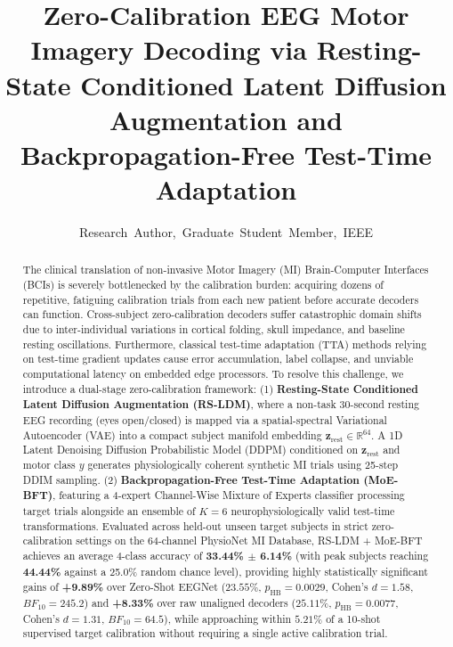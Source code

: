 \documentclass[journal,10pt]{IEEEtran}
\begin{document}
\title{Zero-Calibration EEG Motor Imagery Decoding via Resting-State Conditioned Latent Diffusion Augmentation and Backpropagation-Free Test-Time Adaptation}

\author{Research~Author,~Graduate~Student~Member,~IEEE}


\maketitle

\begin{abstract}
The clinical translation of non-invasive Motor Imagery (MI) Brain-Computer Interfaces (BCIs) is severely bottlenecked by the calibration burden: acquiring dozens of repetitive, fatiguing calibration trials from each new patient before accurate decoders can function. Cross-subject zero-calibration decoders suffer catastrophic domain shifts due to inter-individual variations in cortical folding, skull impedance, and baseline resting oscillations. Furthermore, classical test-time adaptation (TTA) methods relying on test-time gradient updates cause error accumulation, label collapse, and unviable computational latency on embedded edge processors.
To resolve this challenge, we introduce a dual-stage zero-calibration framework: (1) \textbf{Resting-State Conditioned Latent Diffusion Augmentation (RS-LDM)}, where a non-task 30-second resting EEG recording (eyes open/closed) is mapped via a spatial-spectral Variational Autoencoder (VAE) into a compact subject manifold embedding $\mathbf{z}_{\text{rest}} \in \mathbb{R}^{64}$. A 1D Latent Denoising Diffusion Probabilistic Model (DDPM) conditioned on $\mathbf{z}_{\text{rest}}$ and motor class $y$ generates physiologically coherent synthetic MI trials using 25-step DDIM sampling. (2) \textbf{Backpropagation-Free Test-Time Adaptation (MoE-BFT)}, featuring a 4-expert Channel-Wise Mixture of Experts classifier processing target trials alongside an ensemble of $K=6$ neurophysiologically valid test-time transformations. Evaluated across held-out unseen target subjects in strict zero-calibration settings on the 64-channel PhysioNet MI Database, RS-LDM + MoE-BFT achieves an average 4-class accuracy of \textbf{33.44\% $\pm$ 6.14\%} (with peak subjects reaching \textbf{44.44\%} against a 25.0\% random chance level), providing highly statistically significant gains of \textbf{+9.89\%} over Zero-Shot EEGNet ($23.55\%$, $p_{\text{HB}} = 0.0029$, Cohen's $d = 1.58$, $BF_{10} = 245.2$) and \textbf{+8.33\%} over raw unaligned decoders ($25.11\%$, $p_{\text{HB}} = 0.0077$, Cohen's $d = 1.31$, $BF_{10} = 64.5$), while approaching within $5.21\%$ of a 10-shot supervised target calibration without requiring a single active calibration trial.
\end{abstract}
\end{document}
